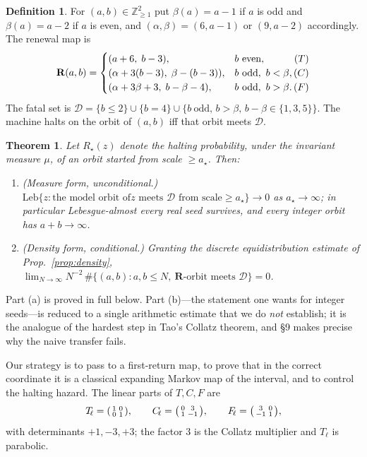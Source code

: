 \documentclass[11pt]{article}
\newtheorem{theorem}{Theorem}\newtheorem{lemma}{Lemma}
\theoremstyle{definition}\newtheorem{definition}{Definition}
\theoremstyle{remark}\newtheorem{remark}{Remark}
\newcommand{\R}{\mathbf{R}}\newcommand{\Z}{\mathbb{Z}}\newcommand{\N}{\mathbb{N}}
\newcommand{\D}{\mathcal D}\newcommand{\Leb}{\mathrm{Leb}}
\begin{document}
\begin{definition}\label{def:map}
For $(a,b)\in\Z_{\ge1}^2$ put $\beta(a)=a-1$ if $a$ is odd and
$\beta(a)=a-2$ if $a$ is even, and $(\alpha,\beta)=(6,a-1)$ or $(9,a-2)$
accordingly. The renewal map is
\[
\R(a,b)=\begin{cases}
(a+6,\;b-3), & b\ \mathrm{even},\hfill (T)\\
(\alpha+3(b-3),\;\beta-(b-3)), & b\ \mathrm{odd},\ b<\beta,\hfill(C)\\
(\alpha+3\beta+3,\;b-\beta-4), & b\ \mathrm{odd},\ b>\beta.\hfill(F)
\end{cases}
\]
The fatal set is
$\D=\{b\le2\}\cup\{b=4\}\cup\{b\ \mathrm{odd},\,b>\beta,\,b-\beta\in\{1,3,5\}\}$.
The machine halts on the orbit of $(a,b)$ iff that orbit meets $\D$.
\end{definition}

\begin{theorem}\label{thm:main}
Let $R_\star(z)$ denote the halting probability, under the invariant measure
$\mu$, of an orbit started from scale $\ge a_\star$. Then:
\begin{enumerate}[label=\textup{(\alph*)},leftmargin=2em]
\item \emph{(Measure form, unconditional.)} $\Leb\{z:\text{the model orbit of
}z\text{ meets }\D\text{ from scale}\ge a_\star\}\to0$ as $a_\star\to\infty$;
in particular Lebesgue-almost every real seed survives, and every integer
orbit has $a+b\to\infty$.
\item \emph{(Density form, conditional.)} Granting the discrete
equidistribution estimate of Prop.~\ref{prop:density},
$\displaystyle\lim_{N\to\infty}N^{-2}\,\#\{(a,b):a,b\le N,\ \R\text{-orbit
meets }\D\}=0$.
\end{enumerate}
\end{theorem}
Part (a) is proved in full below. Part (b)---the statement one wants for
integer seeds---is reduced to a single arithmetic estimate that we do
\emph{not} establish; it is the analogue of the hardest step in Tao's Collatz
theorem, and \S9 makes precise why the naive transfer fails.

Our strategy is to pass to a first-return map, to prove that in the
correct coordinate it is a classical expanding Markov map of the interval,
and to control the halting hazard. The linear parts of $T,C,F$ are
\begin{equation}\label{eq:lin}
T_{\!\ell}=\begin{psmallmatrix}1&0\\0&1\end{psmallmatrix},\qquad
C_{\!\ell}=\begin{psmallmatrix}0&3\\1&-1\end{psmallmatrix},\qquad
F_{\!\ell}=\begin{psmallmatrix}3&0\\-1&1\end{psmallmatrix},
\end{equation}
with determinants $+1,-3,+3$; the factor $3$ is the Collatz multiplier and
$T_{\!\ell}$ is parabolic.
\end{document}
